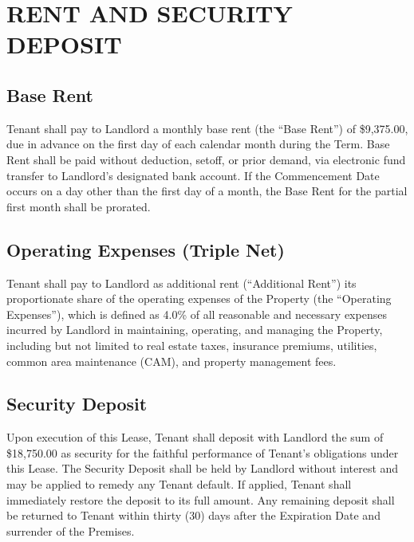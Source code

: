 \section{RENT AND SECURITY DEPOSIT}
\subsection{Base Rent}
Tenant shall pay to Landlord a monthly base rent (the ``Base Rent'') of \$9,375.00, due in advance on the first day of each calendar month during the Term. Base Rent shall be paid without deduction, setoff, or prior demand, via electronic fund transfer to Landlord's designated bank account. If the Commencement Date occurs on a day other than the first day of a month, the Base Rent for the partial first month shall be prorated.

\subsection{Operating Expenses (Triple Net)}
Tenant shall pay to Landlord as additional rent (``Additional Rent'') its proportionate share of the operating expenses of the Property (the ``Operating Expenses''), which is defined as 4.0\% of all reasonable and necessary expenses incurred by Landlord in maintaining, operating, and managing the Property, including but not limited to real estate taxes, insurance premiums, utilities, common area maintenance (CAM), and property management fees.

\subsection{Security Deposit}
Upon execution of this Lease, Tenant shall deposit with Landlord the sum of \$18,750.00 as security for the faithful performance of Tenant's obligations under this Lease. The Security Deposit shall be held by Landlord without interest and may be applied to remedy any Tenant default. If applied, Tenant shall immediately restore the deposit to its full amount. Any remaining deposit shall be returned to Tenant within thirty (30) days after the Expiration Date and surrender of the Premises.
